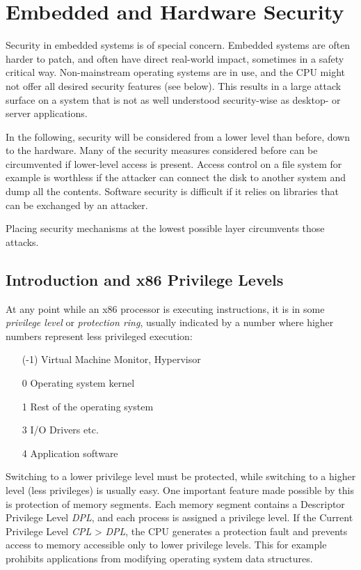 \chapter{Embedded and Hardware Security}

Security in embedded systems is of special concern. Embedded systems are often
harder to patch, and often have direct real-world impact, sometimes in a safety
critical way. Non-mainstream operating systems are in use, and the CPU might not
offer all desired security features (see below). This results in a large attack
surface on a system that is not as well understood security-wise as desktop- or
server applications.

In the following, security will be considered from a lower level than before,
down to the hardware. Many of the security measures considered before can be
circumvented if lower-level access is present. Access control on a file system
for example is worthless if the attacker can connect the disk to another system
and dump all the contents. Software security is difficult if it relies on
libraries that can be exchanged by an attacker.

Placing security mechanisms at the lowest possible layer circumvents those
attacks.

\section{Introduction and x86 Privilege Levels}
At any point while an x86 processor is executing instructions, it is in some
\emph{privilege level} or \emph{protection ring}, usually indicated by a number
where higher numbers represent less privileged execution:

\begin{itemize}
    \item[(-1)] Virtual Machine Monitor, Hypervisor
    \item[0] Operating system kernel
    \item[1] Rest of the operating system
    \item[3] I/O Drivers etc.
    \item[4] Application software
\end{itemize}

Switching to a lower privilege level must be protected, while switching to a
higher level (less privileges) is usually easy. One important feature made
possible by this is protection of memory segments. Each memory segment contains
a Descriptor Privilege Level \textit{DPL}, and each process is assigned a
privilege level. If the Current Privilege Level \textit{CPL} > \textit{DPL}, the
CPU generates a protection fault and prevents access to memory accessible only
to lower privilege levels. This for example prohibits applications from
modifying operating system data structures.

